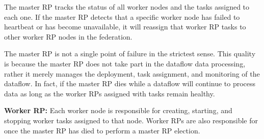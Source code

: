 The master RP tracks the status of all worker nodes and the tasks assigned to each one. If the master RP detects that a specific worker node has failed to heartbeat or has become unavailable, it will reassign that worker RP tasks to other worker RP nodes in the federation.

The master RP is not a single point of failure in the strictest sense. This quality is because the master RP does not take part in the dataflow data processing, rather it merely manages the deployment, task assignment, and monitoring of the dataflow. In fact, if the master RP dies while a dataflow will continue to process data as long as the worker RPs assigned with tasks remain healthy. 

\textbf{Worker RP:} Each worker node is responsible for creating, starting, and stopping worker tasks assigned to that node. Worker RPs are also responsible for once the master RP has died to perform a master RP election.

